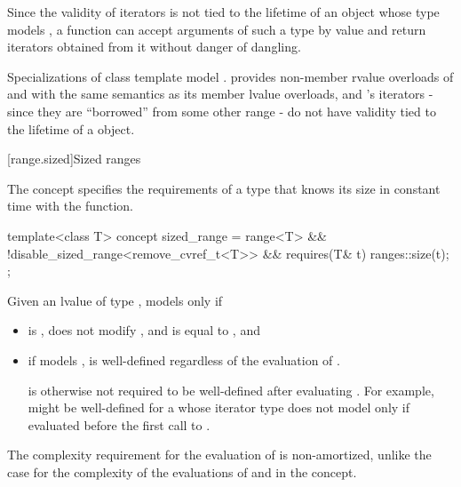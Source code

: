 \begin{itemdescr}
\pnum
\begin{note}
Since the validity of iterators is not tied to the lifetime of
an object whose type models ,
a function can accept arguments of such a type by value and
return iterators obtained from it without danger of dangling.
\end{note}

\pnum
\begin{example}
Specializations of class template 
model .  provides
non-member rvalue overloads of  and  with the same
semantics as its member lvalue overloads, and 's iterators
- since they are ``borrowed'' from some other range -
do not have validity tied to the lifetime of a  object.
\end{example}
\end{itemdescr}

[range.sized]{Sized ranges}

\pnum
The  concept specifies the requirements
of a  type that knows its size in constant time with the
 function.

%
\begin{itemdecl}
template<class T>
  concept sized_range =
    range<T> &&
    !disable_sized_range<remove_cvref_t<T>> &&
    requires(T& t) { ranges::size(t); };
\end{itemdecl}

\begin{itemdescr}
\pnum
Given an lvalue  of type , 
models  only if

\begin{itemize}
\item {} is , does not modify ,
and is equal to , and

\item if  models ,
 is well-defined regardless of the evaluation of
.
\begin{note}
 is otherwise not required to be
well-defined after evaluating .
For example,  might be well-defined
for a  whose iterator type
does not model 
only if evaluated before the first call to .
\end{note}
\end{itemize}

\pnum
\begin{note}
The complexity requirement for the evaluation of 
is non-amortized, unlike the case for the complexity of the evaluations of
 and  in the  concept.
\end{note}
\end{itemdescr}

